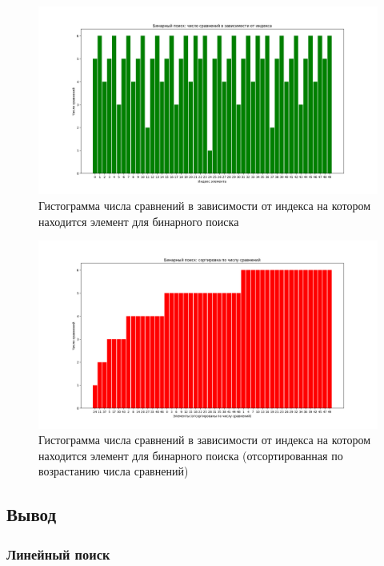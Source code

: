 \begin{figure}[H]
    \centering
    \includegraphics[width=1\textwidth]{img/bar_graph_binary.png}
    \caption{Гистограмма числа сравнений в зависимости от индекса на котором находится элемент для бинарного поиска}
    \label{fig:bar_graph_binary} %
\end{figure}

\begin{figure}[H]
    \centering
    \includegraphics[width=1\textwidth]{img/bar_graph_binary_sort.png}
    \caption{Гистограмма числа сравнений в зависимости от индекса на котором находится элемент для бинарного поиска (отсортированная по возрастанию числа сравнений)}
    \label{fig:bar_graph_binary_sort} %
\end{figure}

\subsection*{Вывод}

\subsubsection*{Линейный поиск}


